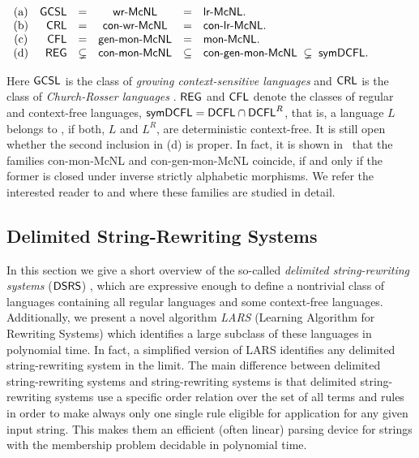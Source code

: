 \begin{theorem}{\rm \cite{Beaudry2003,Leupold2011}}\label{ThmMcNL}\\[+0.2cm]
$\begin{array}[t]{crcccl}
{\rm (a)} & \GCSL & = & \wrMcNL & = & \lrMcNL.\\
{\rm (b)} & \CRL  & = & \conwrMcNL & = & \conlrMcNL.\\
{\rm (c)} & \CFL  & = & \mbox{\sf gen-mon-McNL} & = & \mbox{\sf mon-McNL}.\\
{\rm (d)} & \REG  & \subsetneq & \mbox{\sf con-mon-McNL} & \subseteq & 
\mbox{\sf con-gen-mon-McNL}\; \subsetneq\; \symDCFL.
\end{array}$
\end{theorem}

Here $\GCSL$ is the class of \emph{growing context-sensitive languages} \cite{Buntrock19981,Dahlhaus1986} and $\CRL$ is the class of \emph{Church-Rosser languages} \cite{MNO88}. $\REG$ and $\CFL$ denote the classes of regular and context-free languages, $\symDCFL = \DCFL\cap\DCFL^R$, that is, a language $L$ belongs to \symDCFL, if both, $L$ and $L^R$, are deterministic context-free. It is still open whether the second inclusion in (d) is proper. In fact, it is shown in~\cite{Leupold2011} that the families {\sf con-mon-McNL} and {\sf con-gen-mon-McNL} coincide, if and only if the former is closed under inverse strictly alphabetic morphisms. We refer the interested reader to \cite{Beaudry2003} and \cite{Leupold2011} where these families are studied in detail. 

\subsection{Delimited String-Rewriting Systems}
\label{section:delimited-string-rewriting-systems}

In this section we give a short overview of the so-called \emph{delimited string-rewriting systems} ($\mbox{\sf DSRS}$) \cite{Eyraud2007}, which are expressive enough to define a nontrivial class of languages containing all regular languages and some context-free languages. Additionally, we present a novel algorithm \emph{LARS} \cite{Eyraud2007} (Learning Algorithm for Rewriting Systems) which identifies a large subclass of these languages in polynomial time. In fact, a simplified version of LARS \cite{delaHiguera2010} identifies any delimited string-rewriting system in the limit. The main difference between delimited string-rewriting systems and string-rewriting systems is that delimited string-rewriting systems use a specific order relation over the set of all terms and rules in order to make always only one single rule eligible for application for any given input string. This makes them an efficient (often linear) parsing device for strings with the membership problem decidable in polynomial time.

